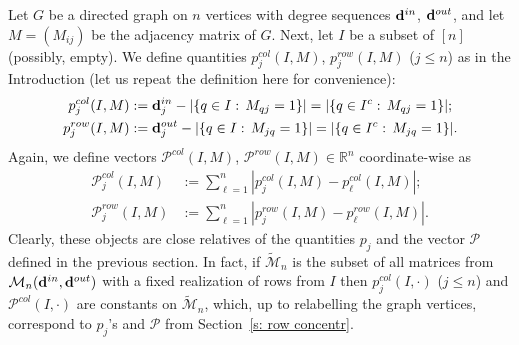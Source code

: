\documentclass[12pt]{article}
\theoremstyle{definition}
\theoremstyle{plain}
\newcommand{\R}{\mathbb{R}}
\def\InDeg{{\bf d}^{in}}
\def\OutDeg{{\bf d}^{out}}
\def\MatrixSet{{\mathcal M}_n}
\def\pvector{{\mathcal P}}
\begin{document}
Let $G$ be a directed graph on $n$ vertices
with degree sequences $\InDeg$, $\OutDeg$, and let $M=(M_{ij})$ be the adjacency matrix of $G$.
Next, let $I$ be a subset of $[n]$ (possibly, empty).
We define quantities $p_j^{col}(I,M)$, $p_j^{row}(I,M)$ ($j\leq n$) as in the Introduction
(let us repeat the definition here for convenience):
\begin{align*}
p_j^{col}(I,M)&:=\InDeg_j-|\{q\in I:\,M_{qj}=1\}|=|\{q\in I^c:\,M_{qj}=1\}|;\\
p_j^{row}(I,M)&:=\OutDeg_j-|\{q\in I:\,M_{jq}=1\}|=|\{q\in I^c:\,M_{jq}=1\}|.
\end{align*}
Again, we define vectors $\pvector^{col}(I,M)$, $\pvector^{row}(I,M)\in\R^n$ coordinate-wise as
\begin{align*}
\pvector^{col}_j(I,M)&:=\sum_{\ell=1}^n |p_j^{col}(I,M)-p_\ell^{col}(I,M)|;\\
\pvector^{row}_j(I,M)&:=\sum_{\ell=1}^n |p_j^{row}(I,M)-p_\ell^{row}(I,M)|.
\end{align*}
Clearly, these objects are close relatives of the quantities $p_j$ and the vector $\pvector$
defined in the previous section. In fact, if $\widetilde \MatrixSet$ is the subset of all matrices from $\MatrixSet(\InDeg, \OutDeg)$
with a fixed realization of rows from $I$ then $p_j^{col}(I,\cdot)$ ($j\leq n$) and
$\pvector^{col}(I,\cdot)$ are constants on $\widetilde \MatrixSet$, which, up to relabelling the graph vertices,
correspond to $p_j$'s and $\pvector$ from Section~\ref{s: row concentr}.
\end{document}
